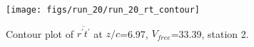 \begin{figure}[H]
\centering
\texttt{[image: figs/run\_20/run\_20\_rt\_contour]}
\caption{Contour plot of $\overline{r^\prime t^\prime}$ at $z/c$=6.97, $V_{free}$=33.39, station 2.}
\label{fig:run_20_rt_contour}
\end{figure}


